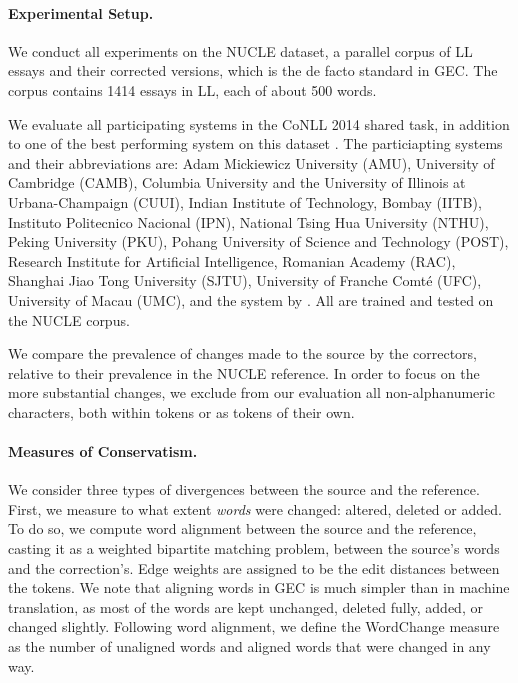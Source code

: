 \documentclass[letter,11pt]{article}
\newcommand{\oa}[1]{\footnote{\color{red}OA: #1}}
\begin{document}
\paragraph{Experimental Setup.}\label{par:experimental_setup}
We conduct all experiments on the NUCLE dataset,
a parallel corpus of LL essays and their corrected versions,
which is the de facto standard in GEC.
The corpus contains 1414 essays in LL, each of about 500 words.

We evaluate all participating systems in the CoNLL 2014 shared task,
in addition to one of the best performing system on this dataset \cite{rozovskaya2014building}.
The particiapting systems and their abbreviations are: Adam Mickiewicz University (AMU),
University of Cambridge (CAMB), Columbia University and the University of Illinois at Urbana-Champaign (CUUI),
Indian Institute of Technology, Bombay (IITB), Instituto Politecnico Nacional (IPN),
National Tsing Hua University (NTHU), Peking University (PKU), Pohang University of Science and Technology (POST),
Research Institute for Artificial Intelligence, Romanian Academy (RAC), Shanghai Jiao Tong University (SJTU),
University of Franche Comt\'{e} (UFC), University of Macau (UMC),
and the system by .
All are trained and tested on the NUCLE corpus.

We compare the prevalence of changes made to the source by the correctors,
relative to their prevalence in the NUCLE reference.
In order to focus on the more substantial changes, we exclude from our evaluation
all non-alphanumeric characters, both within tokens or as tokens of their own.
%

\paragraph{Measures of Conservatism.}
We consider three types of divergences between the source and the reference.
First, we measure to what extent \emph{words} were changed: altered, deleted or added.
To do so, we compute word alignment between the source and the reference, casting it
as a weighted bipartite matching problem, between the source's words and the correction's. 
Edge weights are assigned to be the edit distances
between the tokens.
We note that aligning words in GEC is much simpler than in machine translation,
as most of the words are kept unchanged, deleted fully, added, or changed slightly.
Following word alignment, we define the {\sc WordChange} measure
as the number of unaligned words and aligned words that were changed in any way.
\end{document}
